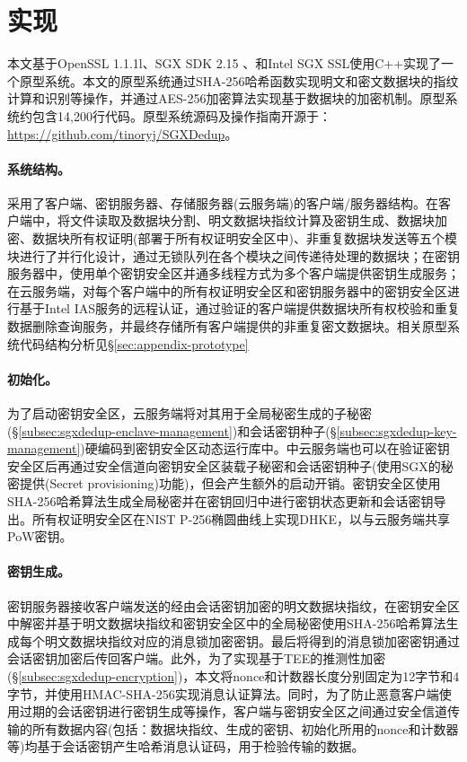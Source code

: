 \section{\sysnameS 实现}
\label{sec:sgxdedup-implementation}

本文基于OpenSSL 1.1.1l、SGX SDK 2.15 、和Intel SGX SSL使用C++实现了一个\sysnameS 原型系统。本文的原型系统通过SHA-256哈希函数实现明文和密文数据块的指纹计算和识别等操作，并通过AES-256加密算法实现基于数据块的加密机制。原型系统约包含14,200行代码。原型系统源码及操作指南开源于：\href{https://github.com/tinoryj/SGXDedup}{https://github.com/tinoryj/SGXDedup}。

\paragraph*{系统结构。}
\sysnameS 采用了客户端、密钥服务器、存储服务器(云服务端)的客户端/服务器结构。在客户端中，将文件读取及数据块分割、明文数据块指纹计算及密钥生成、数据块加密、数据块所有权证明(部署于所有权证明安全区中)、非重复数据块发送等五个模块进行了并行化设计，通过无锁队列在各个模块之间传递待处理的数据块；在密钥服务器中，使用单个密钥安全区并通多线程方式为多个客户端提供密钥生成服务；在云服务端，对每个客户端中的所有权证明安全区和密钥服务器中的密钥安全区进行基于Intel IAS服务的远程认证，通过验证的客户端提供数据块所有权校验和重复数据删除查询服务，并最终存储所有客户端提供的非重复密文数据块。相关原型系统代码结构分析见\S\ref{sec:appendix-prototype}

\paragraph*{初始化。}
为了启动密钥安全区，云服务端将对其用于全局秘密生成的子秘密(\S\ref{subsec:sgxdedup-enclave-management})和会话密钥种子(\S\ref{subsec:sgxdedup-key-management})硬编码到密钥安全区动态运行库中。\sysnameS 中云服务端也可以在验证密钥安全区后再通过安全信道向密钥安全区装载子秘密和会话密钥种子(使用SGX的秘密提供(Secret provisioning)功能)，但会产生额外的启动开销。密钥安全区使用SHA-256哈希算法生成全局秘密并在密钥回归中进行密钥状态更新和会话密钥导出。所有权证明安全区在NIST P-256椭圆曲线上实现DHKE，以与云服务端共享PoW密钥。

\paragraph*{密钥生成。}密钥服务器接收客户端发送的经由会话密钥加密的明文数据块指纹，在密钥安全区中解密并基于明文数据块指纹和密钥安全区中的全局秘密使用SHA-256哈希算法生成每个明文数据块指纹对应的消息锁加密密钥。最后将得到的消息锁加密密钥通过会话密钥加密后传回客户端。此外，为了实现基于TEE的推测性加密(\S\ref{subsec:sgxdedup-encryption})，本文将nonce和计数器长度分别固定为12字节和4字节，并使用HMAC-SHA-256实现消息认证算法。同时，为了防止恶意客户端使用过期的会话密钥进行密钥生成等操作，客户端与密钥安全区之间通过安全信道传输的所有数据内容(包括：数据块指纹、生成的密钥、初始化所用的nonce和计数器等)均基于会话密钥产生哈希消息认证码，用于检验传输的数据。

